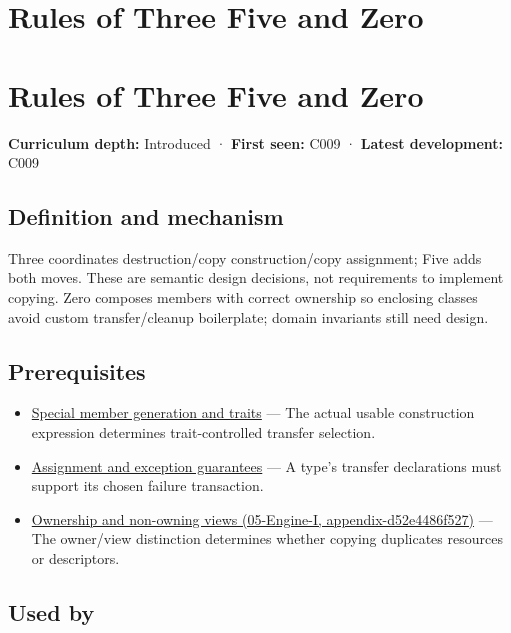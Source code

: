 \hypertarget{appendix-7679107d057e}{}
\section*{Rules of Three Five and Zero}
\section{Rules of Three Five and Zero}\label{appendix-7679107d057e-rules-of-three-five-and-zero}

\textbf{Curriculum depth:} Introduced · \textbf{First seen:} C009 · \textbf{Latest development:} C009

\subsection{Definition and mechanism}\label{appendix-7679107d057e-definition-and-mechanism}

Three coordinates destruction/copy construction/copy assignment; Five adds both moves. These are semantic design decisions, not requirements to implement copying. Zero composes members with correct ownership so enclosing classes avoid custom transfer/cleanup boilerplate; domain invariants still need design.

\subsection{Prerequisites}\label{appendix-7679107d057e-prerequisites}

\begin{itemize}
\tightlist
\item
  \hyperref[appendix-42e02a12c694]{Special member generation and traits} --- The actual usable construction expression determines trait-controlled transfer selection.
\item
  \hyperref[appendix-bea6beb5350f]{Assignment and exception guarantees} --- A type's transfer declarations must support its chosen failure transaction.
\item
  \href{../05-Engine-I/main.pdf\#nameddest=appendix-d52e4486f527}{Ownership and non-owning views (05-Engine-I, appendix-d52e4486f527)} --- The owner/view distinction determines whether copying duplicates resources or descriptors.
\end{itemize}

\subsection{Used by}\label{appendix-7679107d057e-used-by}

